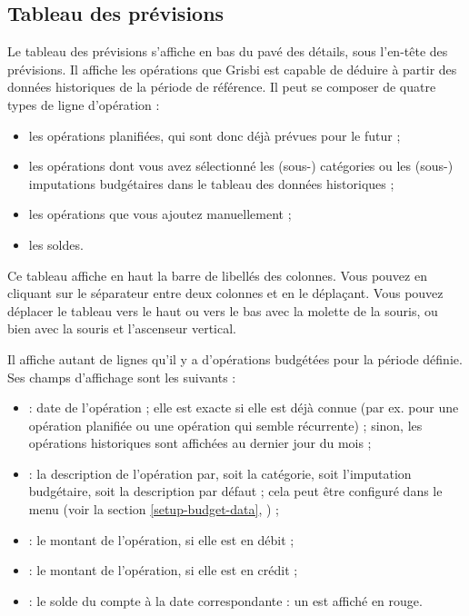 \subsection{Tableau des prévisions\label{budget-estimate-table}}

Le tableau des prévisions s'affiche en bas du pavé des détails, sous l'en-tête des prévisions. Il affiche les opérations que Grisbi est capable de déduire à partir des données historiques de la période de référence. Il peut se composer de quatre types de ligne d'opération : 
\begin{itemize}
	\item les opérations planifiées, qui sont donc déjà prévues pour le futur ;
	\item les opérations dont vous avez sélectionné les (sous-) catégories ou les (sous-) imputations budgétaires dans le tableau des données historiques ; 
	\item les opérations que vous ajoutez manuellement ;
	\item les soldes.
\end{itemize}

Ce tableau affiche en haut la barre de libellés des colonnes. Vous pouvez  en cliquant sur le séparateur entre deux colonnes et en le déplaçant. Vous pouvez déplacer le tableau vers le haut ou vers le bas avec la molette de la souris, ou bien avec la souris et l'ascenseur vertical.
 

Il affiche autant de lignes qu'il y a d'opérations budgétées pour la période définie. Ses champs d'affichage sont les suivants :

\begin{itemize}
	\item{} : date de l'opération ; elle est exacte si elle est déjà connue (par ex. pour une opération planifiée ou une opération qui semble récurrente) ; sinon, les opérations historiques sont affichées au dernier jour du mois ; 
	\item {} : la description de l'opération par, soit la catégorie, soit l'imputation budgétaire, soit la description par défaut ; cela peut être configuré dans le menu  (voir la section \vref{setup-budget-data}, ) ;
	\item {} : le montant de l'opération, si elle est en débit ;
	\item {} : le montant de l'opération, si elle est en crédit ;
	\item {} : le solde du compte à la date correspondante : un  est affiché en rouge{\couleur}.
\end{itemize}

